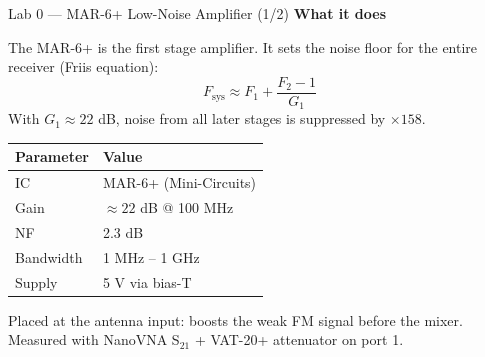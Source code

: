 \documentclass[aspectratio=169]{beamer}
\begin{document}
\begin{frame}{Lab 0 --- MAR-6+ Low-Noise Amplifier (1/2)}
\textbf{What it does}

The MAR-6+ is the first stage amplifier.
It sets the noise floor for the entire receiver (Friis equation):
\[
  F_\text{sys} \approx F_1 + \frac{F_2 - 1}{G_1}
\]
With $G_1 \approx 22$ dB, noise from all later stages is suppressed by $\times 158$.

\vspace{0.3cm}
\begin{tabular}{ll}
\toprule
Parameter & Value \\
\midrule
IC        & MAR-6+ (Mini-Circuits) \\
Gain      & $\approx 22$ dB @ 100 MHz \\
NF        & 2.3 dB \\
Bandwidth & 1 MHz -- 1 GHz \\
Supply    & 5 V via bias-T \\
\bottomrule
\end{tabular}

\vspace{0.3cm}
\small Placed at the antenna input: boosts the weak FM signal before the mixer.\\[4pt]
Measured with NanoVNA S$_{21}$ + VAT-20+ attenuator on port 1.
\end{frame}
\end{document}
